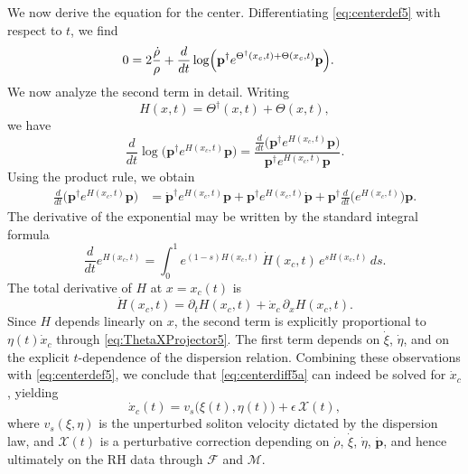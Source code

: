 \documentclass[11pt]{amsart}
\theoremstyle{definition}
\numberwithin{equation}{section}
\begin{document}
We now derive the equation for the center. Differentiating \eqref{eq:centerdef5} with respect to $t$, we find
\begin{align}
0
&=
2\frac{\dot{\rho}}{\rho}
+
\frac{d}{dt}\log\Bigl(
\mathbf{p}^\dagger e^{\Theta^\dagger(x_c,t)+\Theta(x_c,t)}\mathbf{p}
\Bigr).
\label{eq:centerdiff5a}
\end{align}
We now analyze the second term in detail. Writing
\[
H(x,t)=\Theta^\dagger(x,t)+\Theta(x,t),
\]
we have
\begin{equation}
\frac{d}{dt}\log\bigl(\mathbf p^\dagger e^{H(x_c,t)}\mathbf p\bigr)
=
\frac{
\frac{d}{dt}\bigl(\mathbf p^\dagger e^{H(x_c,t)}\mathbf p\bigr)
}{
\mathbf p^\dagger e^{H(x_c,t)}\mathbf p
}.
\label{eq:logderivative5}
\end{equation}
Using the product rule, we obtain
\begin{align}
\frac{d}{dt}\bigl(\mathbf p^\dagger e^{H(x_c,t)}\mathbf p\bigr)
&=
\dot{\mathbf p}^\dagger e^{H(x_c,t)}\mathbf p
+
\mathbf p^\dagger e^{H(x_c,t)}\dot{\mathbf p}
+
\mathbf p^\dagger \frac{d}{dt}\bigl(e^{H(x_c,t)}\bigr)\mathbf p.
\label{eq:innerderivative5}
\end{align}
The derivative of the exponential may be written by the standard integral formula
\begin{equation}
\frac{d}{dt}e^{H(x_c,t)}
=
\int_0^1 e^{(1-s)H(x_c,t)}\,\dot H(x_c,t)\,e^{sH(x_c,t)}\,ds.
\label{eq:expderivative5}
\end{equation}
The total derivative of $H$ at $x=x_c(t)$ is
\begin{equation}
\dot H(x_c,t)
=
\partial_t H(x_c,t)+\dot x_c\,\partial_x H(x_c,t).
\label{eq:Hdot5}
\end{equation}
Since $H$ depends linearly on $x$, the second term is explicitly proportional to $\eta(t)\dot x_c$ through \eqref{eq:ThetaXProjector5}. The first term depends on $\dot\xi$, $\dot\eta$, and on the explicit $t$-dependence of the dispersion relation. Combining these observations with \eqref{eq:centerdef5}, we conclude that \eqref{eq:centerdiff5a} can indeed be solved for $\dot x_c$, yielding
\begin{equation}
\dot{x}_c(t)=v_s\bigl(\xi(t),\eta(t)\bigr)+\epsilon\,\mathcal{X}(t),
\label{eq:xcdot5}
\end{equation}
where $v_s(\xi,\eta)$ is the unperturbed soliton velocity dictated by the dispersion law, and $\mathcal X(t)$ is a perturbative correction depending on $\dot\rho$, $\dot\xi$, $\dot\eta$, $\dot{\mathbf p}$, and hence ultimately on the RH data through $\mathcal F$ and $\mathcal M$.
\end{document}
